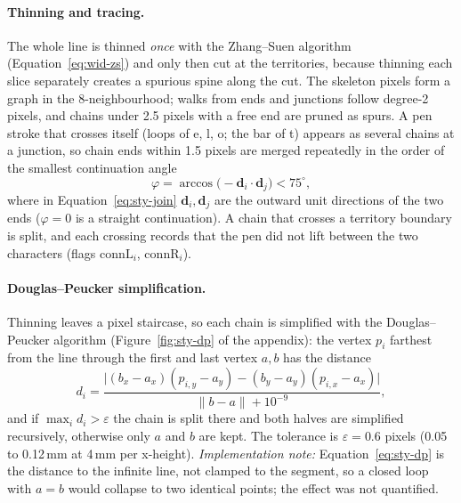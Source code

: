 \paragraph{Thinning and tracing.}
The whole line is thinned \emph{once} with the Zhang--Suen algorithm \cite{zhang1984} (Equation~\ref{eq:wid-zs}) and only then cut at the territories, because thinning each slice separately creates a spurious spine along the cut.
The skeleton pixels form a graph in the 8-neighbourhood; walks from ends and junctions follow degree-2 pixels, and chains under 2.5 pixels with a free end are pruned as spurs.
A pen stroke that crosses itself (loops of e, l, o; the bar of t) appears as several chains at a junction, so chain ends within 1.5 pixels are merged repeatedly in the order of the smallest continuation angle
\begin{equation}
\varphi=\arccos\bigl(-\mathbf d_i\cdot\mathbf d_j\bigr)<75^\circ,
\label{eq:sty-join}
\end{equation}
where in Equation~\ref{eq:sty-join} $\mathbf d_i,\mathbf d_j$ are the outward unit directions of the two ends ($\varphi=0$ is a straight continuation).
A chain that crosses a territory boundary is split, and each crossing records that the pen did not lift between the two characters (flags $\mathrm{connL}_i$, $\mathrm{connR}_i$).

\paragraph{Douglas--Peucker simplification.}
Thinning leaves a pixel staircase, so each chain is simplified with the Douglas--Peucker algorithm \cite{douglas1973} (Figure~\ref{fig:sty-dp} of the appendix): the vertex $p_i$ farthest from the line through the first and last vertex $a,b$ has the distance
\begin{equation}
d_i=\frac{\bigl|(b_x-a_x)(p_{i,y}-a_y)-(b_y-a_y)(p_{i,x}-a_x)\bigr|}{\lVert b-a\rVert+10^{-9}},
\label{eq:sty-dp}
\end{equation}
and if $\max_id_i>\varepsilon$ the chain is split there and both halves are simplified recursively, otherwise only $a$ and $b$ are kept.
The tolerance is $\varepsilon=0.6$ pixels (0.05 to 0.12\,mm at 4\,mm per x-height).
\emph{Implementation note:} Equation~\ref{eq:sty-dp} is the distance to the infinite line, not clamped to the segment, so a closed loop with $a=b$ would collapse to two identical points; the effect was not quantified.

